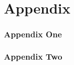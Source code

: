 \part*{Appendix}
\renewcommand{\thesection}{\arabic{section}}
\renewcommand{\theequation}{\arabic{equation}}
\section{Appendix One}\label{section:Appendix One}
\newpage
\section{Appendix Two}\label{section:Appendix Two}